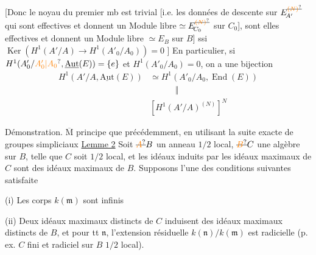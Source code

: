 [Donc le noyau du premier mb est trivial [i.e.
les données de descente sur $E_{\!A'}^{\deleted{\unsure{(N)}}}$ qui sont 
 effectives et donnent un Module libre  $\simeq E_{\!C_0}^{\deleted{\unsure{(N)}}}$
sur $C_0$], sont elles  effectives et donnent
un Module libre $\simeq E_B$ sur $B$] ssi
$\operatorname{Ker}(H^1(A'/A)\to H^1(A'_0/A_0))=0$ ] En particulier,
si $H^1(A'_0/\unsure{A'_0|A_0},\underline{\mathrm{Aut}}(E))=\{e\}$ et $H^1(A'_0/A_0)=0$, on a
une bijection
\[
\begin{aligned}
H^1(A'/A,\underline{\mathrm{Aut}}(E))&\simeq H^1(A'_0/A_0,\operatorname{End}(E))\\
&\hspace{3em}\Vert\\
&[H^1(A'/A)^{(N)}]^N
\end{aligned}
\]

Démonstration. $\overline{\mathrm M}$ principe que précédemment,
en utilisant la suite exacte de groupes simpliciaux
\uline{Lemme 2} Soit $\deleted{\unsure{A}}B$ un anneau $1/2$ local, $\deleted{\unsure{B}}C$ une algèbre 
sur $B$, telle que $C$ soit $1/2$ local, et les idéaux
induits par les idéaux maximaux  de $C$ sont des
idéaux maximaux   de $B$. Supposons l'une
des conditions suivantes satisfaite

(i) Les corps $k(\mathfrak m)$ sont infinis

(ii) Deux idéaux maximaux  distincts de $C$
induisent des idéaux maximaux  distincts de $B$,
et pour tt $\mathfrak n$, l'extension résiduelle $k(\mathfrak n)/k(\mathfrak m)$
est radicielle (p. ex. $C$ fini et radiciel sur $B$
$1/2$ local).

